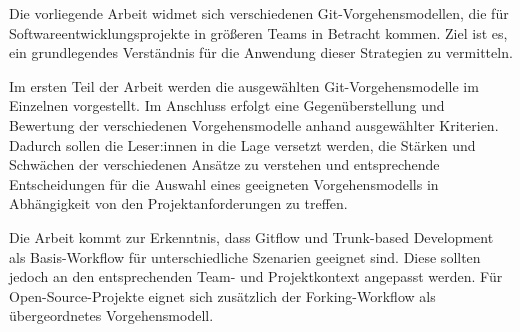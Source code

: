 
Die vorliegende Arbeit widmet sich verschiedenen Git\hyp Vorgehensmodellen, die für Softwareentwicklungsprojekte in größeren Teams in Betracht kommen. Ziel ist es, ein grundlegendes Verständnis für die Anwendung dieser Strategien zu vermitteln.

Im ersten Teil der Arbeit werden die ausgewählten Git\hyp Vorgehensmodelle im Einzelnen vorgestellt. Im Anschluss erfolgt eine Gegenüberstellung und Bewertung der verschiedenen Vorgehensmodelle anhand ausgewählter Kriterien. Dadurch sollen die Leser:innen in die Lage versetzt werden, die Stärken und Schwächen der verschiedenen Ansätze zu verstehen und entsprechende Entscheidungen für die Auswahl eines geeigneten Vorgehensmodells in Abhängigkeit von den Projektanforderungen zu treffen.

Die Arbeit kommt zur Erkenntnis, dass Gitflow und Trunk\hyp based Development als Basis\hyp Workflow für unterschiedliche Szenarien geeignet sind. Diese sollten jedoch an den entsprechenden Team- und Projektkontext angepasst werden. Für Open\hyp Source\hyp Projekte eignet sich zusätzlich der Forking\hyp Workflow als übergeordnetes Vorgehensmodell.

